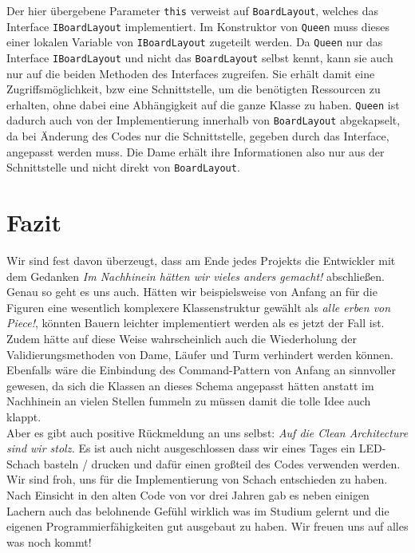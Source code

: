 \documentclass[
10pt, %
a4paper, %
oneside, %
headinclude,footinclude, %
BCOR5mm, %
]{scrartcl}
\begin{document}
\begin{onehalfspace}
Der hier übergebene Parameter \texttt{this} verweist auf \texttt{BoardLayout}, welches das Interface \texttt{IBoardLayout} implementiert. Im Konstruktor von \texttt{Queen} muss dieses einer lokalen Variable von \texttt{IBoardLayout} zugeteilt werden. Da \texttt{Queen} nur das Interface \texttt{IBoardLayout}
und nicht das \texttt{BoardLayout} selbst kennt, kann sie auch nur auf die beiden Methoden des Interfaces zugreifen. Sie erhält damit eine Zugriffsmöglichkeit, bzw eine Schnittstelle, um die benötigten Ressourcen zu erhalten, ohne dabei eine Abhängigkeit auf die ganze Klasse zu haben. \texttt{Queen} ist dadurch auch von der Implementierung innerhalb von \texttt{BoardLayout} abgekapselt, da bei Änderung des Codes nur die Schnittstelle, gegeben durch das Interface, angepasst werden muss. Die Dame erhält ihre Informationen also nur aus der Schnittstelle und nicht direkt von \texttt{BoardLayout}.
\newpage
\section{Fazit}
\label{sec:end}

Wir sind fest davon überzeugt, dass am Ende jedes Projekts die Entwickler mit dem Gedanken \textit{Im Nachhinein hätten wir vieles anders gemacht!} abschließen. Genau so geht es uns auch. Hätten wir beispielsweise von Anfang an für die Figuren eine wesentlich komplexere Klassenstruktur gewählt als \textit{alle erben von Piece!}, könnten Bauern leichter implementiert werden als es jetzt der Fall ist. Zudem hätte auf diese Weise wahrscheinlich auch die Wiederholung der Validierungsmethoden von Dame, Läufer und Turm verhindert werden können. \\
Ebenfalls wäre die Einbindung des Command-Pattern von Anfang an sinnvoller gewesen, da sich die Klassen an dieses Schema angepasst hätten anstatt im Nachhinein an vielen Stellen fummeln zu müssen damit die tolle Idee auch klappt. \\
Aber es gibt auch positive Rückmeldung an uns selbst: \textit{Auf die Clean Architecture sind wir stolz.} Es ist auch nicht ausgeschlossen dass wir eines Tages ein LED-Schach basteln / drucken und dafür einen großteil des Codes verwenden werden.\\
Wir sind froh, uns für die Implementierung von Schach entschieden zu haben. Nach Einsicht in den alten Code von vor drei Jahren gab es neben einigen Lachern auch das belohnende Gefühl wirklich was im Studium gelernt und die eigenen Programmierfähigkeiten gut ausgebaut zu haben. Wir freuen uns auf alles was noch kommt!


\end{onehalfspace}
\end{document}
